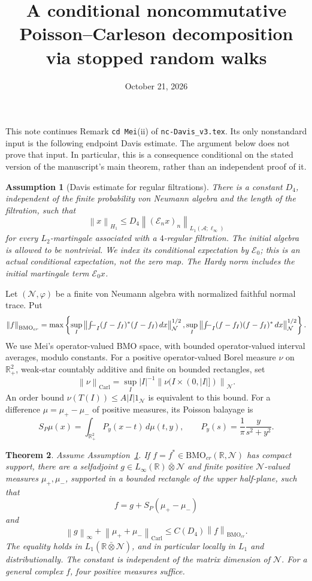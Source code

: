 \documentclass[11pt]{article}
\title{A conditional noncommutative Poisson--Carleson decomposition\\
via stopped random walks}
\author{}
\date{October 21, 2026}
\newtheorem{theorem}{Theorem}
\newtheorem{assumption}[theorem]{Assumption}
\newcommand{\N}{\mathcal N}
\newcommand{\A}{\mathcal A}
\newcommand{\BMO}{\mathrm{BMO}}
\newcommand{\Carl}{\mathrm{Carl}}
\newcommand{\R}{\mathbb R}
\newcommand{\norm}[1]{\left\|#1\right\|}
\newcommand{\fint}{\mathop{\textstyle\int\kern-1.1ex-}\nolimits}
\begin{document}
\maketitle

\noindent
This note continues Remark \texttt{cd Mei}(ii) of
\texttt{nc-Davis\_v3.tex}. Its only nonstandard input is the following
endpoint Davis estimate. The argument below does not prove that input.
In particular, this is a consequence conditional on the stated version
of the manuscript's main theorem, rather than an independent proof of it.

\begin{assumption}[Davis estimate for regular filtrations]\label{ass:D}
There is a constant \(D_4\), independent of the finite probability
von Neumann algebra and the length of the filtration, such that
\[
 \norm{x}_{H_1}\le D_4
 \norm{(\mathcal E_nx)_n}_{L_1(\A;\ell_\infty)}
\]
for every \(L_2\)-martingale associated with a \(4\)-regular filtration.
The initial algebra is allowed to be nontrivial. We index its
conditional expectation by \(\mathcal E_0\); this is an actual
conditional expectation, not the zero map. The Hardy norm includes
the initial martingale term \(\mathcal E_0x\).
\end{assumption}

Let \((\N,\varphi)\) be a finite von Neumann algebra with normalized
faithful normal trace. Put
\[
 \norm{f}_{\BMO_{cr}}
 =\max\left\{
 \sup_I\norm{\fint_I(f-f_I)^*(f-f_I)\,dx}_{\N}^{1/2},
 \sup_I\norm{\fint_I(f-f_I)(f-f_I)^*\,dx}_{\N}^{1/2}
 \right\}.
\]
We use Mei's operator-valued BMO space, with bounded operator-valued
interval averages, modulo constants. For a positive operator-valued
Borel measure \(\nu\) on \(\R^2_+\), weak-star countably additive and
finite on bounded rectangles, set
\[
 \norm{\nu}_{\Carl}
 =\sup_I |I|^{-1}\norm{\nu(I\times(0,|I|])}_{\N}.
\]
An order bound \(\nu(T(I))\le A|I|1_\N\) is equivalent to this bound.
For a difference \(\mu=\mu_+-\mu_-\) of positive measures, its Poisson
balayage is
\[
 S_P\mu(x)=\int_{\R^2_+}P_y(x-t)\,d\mu(t,y),
 \qquad P_y(s)=\frac1\pi\frac{y}{s^2+y^2}.
\]

\begin{theorem}\label{thm:main}
Assume Assumption~\ref{ass:D}. If \(f=f^*\in\BMO_{cr}(\R,\N)\) has compact
support, there are a selfadjoint \(g\in L_\infty(\R)\bar\otimes\N\) and
finite positive \(\N\)-valued measures \(\mu_+,\mu_-\), supported in a bounded
rectangle of the upper half-plane, such that
\[
 \boxed{f=g+S_P(\mu_+-\mu_-)}
\]
and
\[
 \boxed{\norm{g}_\infty+\norm{\mu_++\mu_-}_{\Carl}
       \le C(D_4)\norm{f}_{\BMO_{cr}}.}
\]
The equality holds in \(L_1(\R\bar\otimes\N)\), and in particular locally
in \(L_1\) and distributionally. The constant is independent of the
matrix dimension of \(\N\). For a general complex \(f\), four positive
measures suffice.
\end{theorem}
\end{document}

